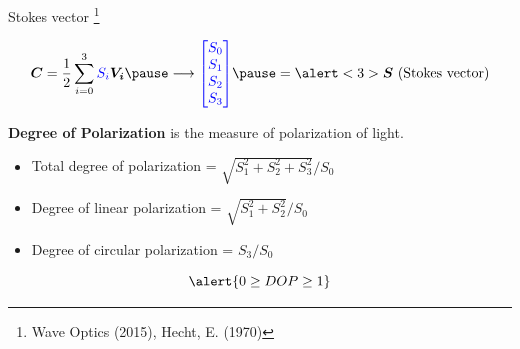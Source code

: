 \documentclass[12pt, dvipsnames]{beamer}
\numberwithin{equation}{section}
\newcommand\blfootnote[1]{%
	\begingroup
	\renewcommand\thefootnote{}\footnote{#1}%
	\addtocounter{footnote}{-1}%
	\endgroup
}
\begin{document}

\begin{frame}{Stokes vector}\blfootnote{Wave Optics (2015), Hecht, E. (1970) }
	$$\boldsymbol{C} = \frac{1}{2} \sum_{i=0}^{3} {\color{blue}S_i} \boldsymbol{V_i}\pause \longrightarrow {\color{blue}\begin{bmatrix} S_0\\ S_1\\ S_2\\S_3\end{bmatrix}}\pause = \alert<3>{\boldsymbol{S} \text{ (Stokes vector)}}$$\pause
	
	\textbf{Degree of Polarization} \pause is the measure of polarization of light.\pause
	
	\begin{itemize}
		\item Total degree of polarization = $\sqrt{S_1^2+S_2^2+S_3^2}/S_0$\pause
		\item Degree of linear polarization = $\sqrt{S_1^2+S_2^2}/S_0$\pause
		\item Degree of circular polarization = $S_3/S_0$\pause
	\end{itemize}
	$$\alert{0\ge DOP\ge1}$$
	
\end{frame}
\end{document}
